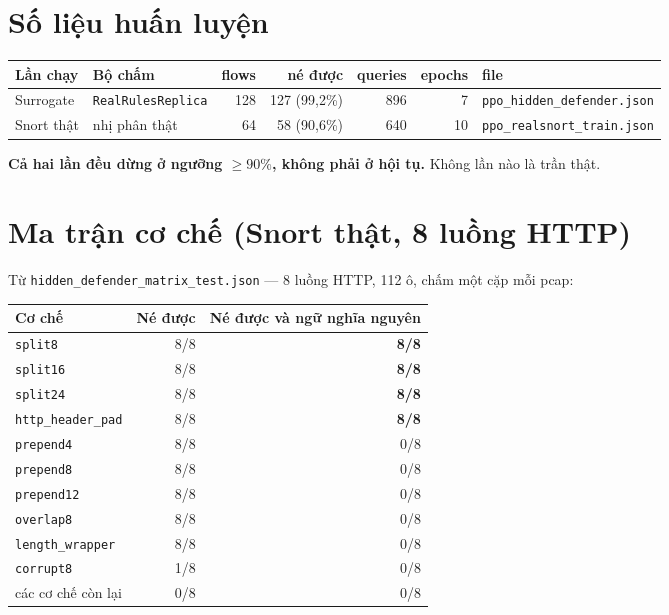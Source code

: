 \documentclass[12pt,a4paper]{report}
\begin{document}
\section{Số liệu huấn luyện}

\begin{center}
\begin{tabular}{llrrrrl}
\toprule
Lần chạy & Bộ chấm & flows & né được & queries & epochs & file \\
\midrule
Surrogate & \texttt{RealRulesReplica} & 128 & 127 (99{,}2\%) & 896 & 7  & \texttt{ppo\_hidden\_defender.json} \\
Snort thật & nhị phân thật & 64 & 58 (90{,}6\%) & 640 & 10 & \texttt{ppo\_realsnort\_train.json} \\
\bottomrule
\end{tabular}
\end{center}
\textbf{Cả hai lần đều dừng ở ngưỡng $\ge 90\%$, không phải ở hội tụ.} Không lần nào
là trần thật.

\section{Ma trận cơ chế (Snort thật, 8 luồng HTTP)}

Từ \texttt{hidden\_defender\_matrix\_test.json} — 8 luồng HTTP, 112 ô, chấm một cặp
mỗi pcap:

\begin{center}
\begin{tabular}{lrr}
\toprule
Cơ chế & Né được & Né được \textbf{và} ngữ nghĩa nguyên \\
\midrule
\texttt{split8}          & 8/8 & \textbf{8/8} \\
\texttt{split16}         & 8/8 & \textbf{8/8} \\
\texttt{split24}         & 8/8 & \textbf{8/8} \\
\texttt{http\_header\_pad} & 8/8 & \textbf{8/8} \\
\texttt{prepend4}        & 8/8 & 0/8 \\
\texttt{prepend8}        & 8/8 & 0/8 \\
\texttt{prepend12}       & 8/8 & 0/8 \\
\texttt{overlap8}        & 8/8 & 0/8 \\
\texttt{length\_wrapper} & 8/8 & 0/8 \\
\texttt{corrupt8}        & 1/8 & 0/8 \\
các cơ chế còn lại      & 0/8 & 0/8 \\
\bottomrule
\end{tabular}
\end{center}
\end{document}
